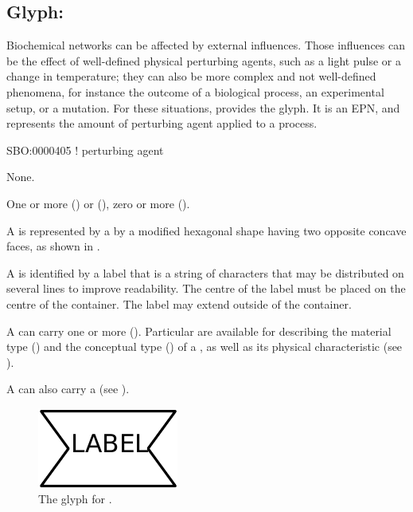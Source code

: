 
\subsection{Glyph: }
\label{sec:perturbing agent}

Biochemical networks can be affected by external influences.
Those influences can be the effect of well-defined physical perturbing agents, such as a light pulse or a change in temperature; they can also be more complex and not well-defined phenomena, for instance the outcome of a biological process, an experimental setup, or a mutation.
For these situations, \PD provides the  glyph. It is an EPN, and represents the amount of perturbing agent applied to a process.

\begin{glyphDescription}

\glyphSboTerm
SBO:0000405 ! perturbing agent


\glyphIncoming
None.



\glyphOutgoing
One or more  () or  (), zero or more  ().


\glyphContainer
A  is represented by a by a modified hexagonal shape having two opposite concave faces, as shown in .

\glyphLabel
A  is identified by a label that is  a string of characters that may be distributed on several lines to improve readability.
The centre of the label must be placed on the centre of the container.
The label may extend outside of the container.

\glyphAux
A  can carry one or more  ().
Particular  are available for describing the material type () and the conceptual type () of a , as well as its physical characteristic (see ).

A  can also carry a  (see ).

\end{glyphDescription}

\begin{figure}[H]
  \centering
  \includegraphics{images/build/perturbing_agent.pdf}
  \caption{The \PD glyph for .}
  \label{fig:perturbing_agent}
\end{figure}


